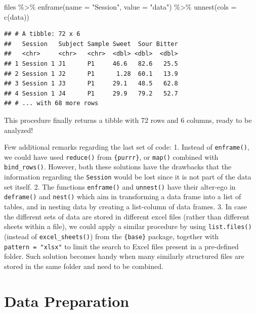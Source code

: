 \documentclass[
]{krantz}
\makeatletter
\newenvironment{Shaded}{\begin{snugshade}}{\end{snugshade}}
\newcommand{\AttributeTok}[1]{\textcolor[rgb]{0.61,0.61,0.61}{#1}}
\newcommand{\FunctionTok}[1]{\textcolor[rgb]{0,0,0}{#1}}
\newcommand{\NormalTok}[1]{#1}
\newcommand{\SpecialCharTok}[1]{\textcolor[rgb]{0,0,0}{#1}}
\newcommand{\StringTok}[1]{\textcolor[rgb]{0.5,0.5,0.5}{#1}}
\renewenvironment{quote}{\begin{VF}}{\end{VF}}
\newenvironment{kframe}{%
\medskip{}
\setlength{\fboxsep}{.8em}
 \def\at@end@of@kframe{}%
 \ifinner\ifhmode%
  \def\at@end@of@kframe{\end{minipage}}%
  \begin{minipage}{\columnwidth}%
 \fi\fi%
 \def\FrameCommand##1{\hskip\@totalleftmargin \hskip-\fboxsep
 \colorbox{shadecolor}{##1}\hskip-\fboxsep
     \hskip-\linewidth \hskip-\@totalleftmargin \hskip\columnwidth}%
 \MakeFramed {\advance\hsize-\width
   \@totalleftmargin\z@ \linewidth\hsize
   \@setminipage}}%
 {\par\unskip\endMakeFramed%
 \at@end@of@kframe}
\renewenvironment{Shaded}{\begin{kframe}}{\end{kframe}}
\makeatother
\begin{document}
\begin{Shaded}
\begin{Highlighting}[]
\NormalTok{files }\SpecialCharTok{\%\textgreater{}\%} 
  \FunctionTok{enframe}\NormalTok{(}\AttributeTok{name =} \StringTok{"Session"}\NormalTok{, }\AttributeTok{value =} \StringTok{"data"}\NormalTok{) }\SpecialCharTok{\%\textgreater{}\%} 
  \FunctionTok{unnest}\NormalTok{(}\AttributeTok{cols =} \FunctionTok{c}\NormalTok{(data))}
\end{Highlighting}
\end{Shaded}

\begin{verbatim}
## # A tibble: 72 x 6
##   Session   Subject Sample Sweet  Sour Bitter
##   <chr>     <chr>   <chr>  <dbl> <dbl>  <dbl>
## 1 Session 1 J1      P1     46.6   82.6   25.5
## 2 Session 1 J2      P1      1.28  60.1   13.9
## 3 Session 1 J3      P1     29.1   48.5   62.8
## 4 Session 1 J4      P1     29.9   79.2   52.7
## # ... with 68 more rows
\end{verbatim}

This procedure finally returns a tibble with 72 rows and 6 columns, ready to be analyzed!

\begin{quote}
Few additional remarks regarding the last set of code:
1. Instead of \texttt{enframe()}, we could have used \texttt{reduce()} from \texttt{\{purrr\}}, or \texttt{map()} combined with \texttt{bind\_rows()}. However, both these solutions have the drawbacks that the information regarding the \texttt{Session} would be lost since it is not part of the data set itself.
2. The functions \texttt{enframe()} and \texttt{unnest()} have their alter-ego in \texttt{deframe()} and \texttt{nest()} which aim in transforming a data frame into a list of tables, and in nesting data by creating a list-column of data frames.
3. In case the different sets of data are stored in different excel files (rather than different sheets within a file), we could apply a similar procedure by using \texttt{list.files()} (instead of \texttt{excel\_sheets()}) from the \texttt{\{base\}} package, together with \texttt{pattern\ =\ "xlsx"} to limit the search to Excel files present in a pre-defined folder. Such solution becomes handy when many similarly structured files are stored in the same folder and need to be combined.
\end{quote}

\hypertarget{data-prep}{%
\chapter{Data Preparation}\label{data-prep}}
\end{document}
